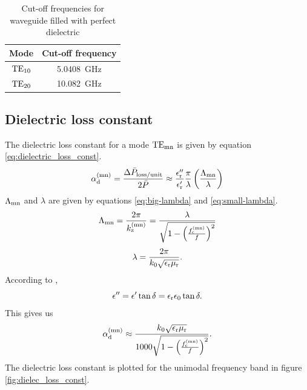 \documentclass[12pt,a4paper, english, titlepage]{article}
\begin{document}
\begin{table}[h t b p]
\centering
\caption{Cut-off frequencies for waveguide filled with perfect dielectric}
\begin{tabular}{|c|c|} \hline
Mode & Cut-off frequency \\ \hline
${\rm TE}_{\rm 10}$ & \SI{5.0408}{\giga\hertz} \\
${\rm TE}_{\rm 20}$ & \SI{10.082}{\giga\hertz} \\ \hline
\end{tabular}
\label{tab:cut-off-student-nr}
\end{table}

\subsection{Dielectric loss constant}
The dielectric loss constant for a mode ${\rm TE}_{\rm mn}$ is given by equation \ref{eq:dielectric_loss_const}.
\begin{equation}
\alpha _{\rm d}^{\rm (mn)} = \frac{\Delta \bar P _{\rm loss/unit}}{2 \bar P} \approx \frac{\epsilon _{\rm r}''}{\epsilon _{\rm r}'} \frac{\pi}{\lambda} \left(\frac{\Lambda _{\rm mn}}{\lambda}\right)
\label{eq:dielectric_loss_const}
\end{equation}
$\Lambda _{\rm mn}$ and $\lambda$ are given by equations \ref{eq:big-lambda} and \ref{eq:small-lambda}.
\begin{equation}
\Lambda _{\rm mn} = \frac{2 \pi}{k_{\rm z}^{\rm (mn)}} = \frac{\lambda}{\sqrt{1 - \left(\frac{f_{\rm c}^{\rm (mn)}}{f}\right)^2}}
\label{eq:big-lambda}
\end{equation}
\begin{equation}
\lambda = \frac{2 \pi}{k_{\rm 0} \sqrt{\epsilon_{\rm r} \mu_{\rm r}}}.
\label{eq:small-lambda}
\end{equation}
According to \citep{pozar},
\begin{equation}
\epsilon'' = \epsilon' \tan \delta = \epsilon _{\rm r} \epsilon _{\rm 0} \tan \delta.
\end{equation}
This gives us 
\begin{equation}
\alpha _{\rm d}^{\rm (mn)} \approx \frac{k_{\rm 0} \sqrt{\epsilon_{\rm r} \mu_{\rm r}}}{1000 \sqrt{1 - \left(\frac{f_{\rm c}^{\rm (mn)}}{f}\right)^2}}.
\end{equation}
The dielectric loss constant is plotted for the unimodal frequency band in figure \ref{fig:dielec_loss_const}.
\end{document}
